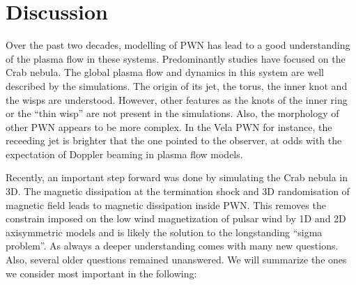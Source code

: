 \section{Discussion}
\label{sec:discussion}

Over the past two decades, modelling of PWN has lead to a good understanding of the plasma flow in these systems. Predominantly studies have focused on the Crab nebula.  The global plasma flow and dynamics in this system are well described by the simulations. The origin of its jet, the torus, the inner knot and the wisps are understood. However, other features as the knots of the inner ring or the ``thin wisp'' \cite{Hester_1995} are not present in the simulations. Also, the morphology of other PWN appears to be more complex. In the Vela PWN for instance, the receeding jet is brighter that the one pointed to the observer, at odds with the expectation of Doppler beaming in plasma flow models.

Recently, an important step forward was done by simulating the Crab nebula in 3D. The magnetic dissipation at the termination shock and 3D randomisation of magnetic field leads to magnetic dissipation  inside PWN. This removes the constrain imposed on the low wind magnetization of pulsar wind by 1D and 2D axisymmetric models and is likely the solution to the longstanding ``sigma problem''. As always a deeper understanding comes with many new questions. Also, several older questions remained unanswered. We will summarize the ones we consider most important in the following: 

